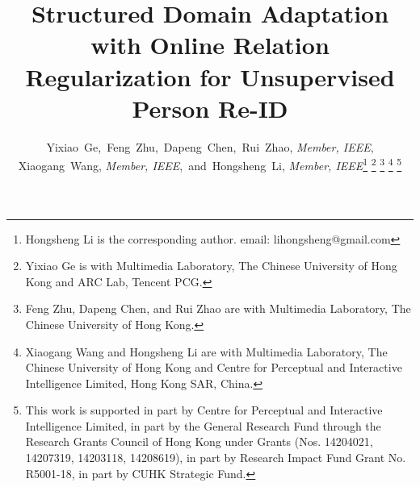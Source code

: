 \documentclass[journal]{IEEEtran}
\begin{document}
\title{Structured Domain Adaptation with Online Relation Regularization for Unsupervised Person Re-ID}


\author{Yixiao~Ge,~Feng~Zhu,~Dapeng~Chen,~Rui~Zhao, \textit{Member, IEEE},\\Xiaogang~Wang, \textit{Member, IEEE},~and~Hongsheng~Li, \textit{Member, IEEE}\thanks{
Hongsheng Li is the corresponding author.
email: lihongsheng@gmail.com
}
\thanks{Yixiao Ge is with Multimedia Laboratory, The Chinese University of Hong Kong and ARC Lab, Tencent PCG.}
\thanks{
Feng Zhu, Dapeng Chen, and Rui Zhao are with Multimedia Laboratory, The Chinese University of Hong Kong.}
\thanks{
Xiaogang Wang and Hongsheng Li are with Multimedia Laboratory, The Chinese University of Hong Kong and Centre for Perceptual and Interactive Intelligence Limited, Hong Kong SAR, China.}
\thanks{
This work is supported in part by Centre for Perceptual and Interactive Intelligence Limited, in part by the General Research Fund through the Research Grants Council of Hong Kong under Grants (Nos. 14204021, 14207319, 14203118, 14208619), in part by Research Impact Fund Grant No. R5001-18, in part by CUHK Strategic Fund.
}
}






















\maketitle
\end{document}
